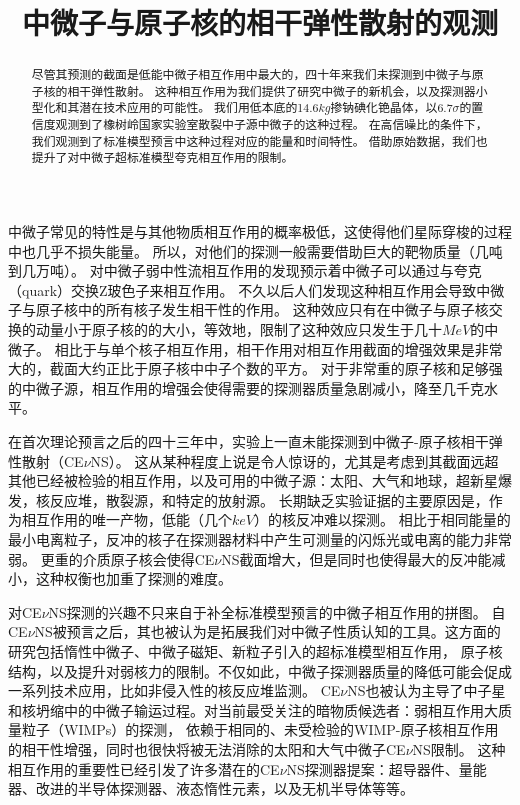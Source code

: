 
\begin{translation}
\label{cha:translation}

\title{中微子与原子核的相干弹性散射的观测}
\maketitle

\tableofcontents

\begin{abstract}
  尽管其预测的截面是低能中微子相互作用中最大的，四十年来我们未探测到中微子与原子核的相干弹性散射。
  这种相互作用为我们提供了研究中微子的新机会，以及探测器小型化和其潜在技术应用的可能性。
  我们用低本底的14.6$\si{kg}$掺钠碘化铯晶体，以6.7$\sigma$的置信度观测到了橡树岭国家实验室散裂中子源中微子的这种过程。
  在高信噪比的条件下，我们观测到了标准模型预言中这种过程对应的能量和时间特性。
  借助原始数据，我们也提升了对中微子超标准模型夸克相互作用的限制。
\end{abstract}

中微子常见的特性是与其他物质相互作用的概率极低，这使得他们星际穿梭的过程中也几乎不损失能量。
所以，对他们的探测一般需要借助巨大的靶物质量（几吨到几万吨）。
对中微子弱中性流相互作用的发现预示着中微子可以通过与夸克（quark）交换Z玻色子来相互作用。
不久以后人们发现这种相互作用会导致中微子与原子核中的所有核子发生相干性的作用。
这种效应只有在中微子与原子核交换的动量小于原子核的的大小，等效地，限制了这种效应只发生于几十$\si{MeV}$的中微子。
相比于与单个核子相互作用，相干作用对相互作用截面的增强效果是非常大的，截面大约正比于原子核中中子个数的平方。
对于非常重的原子核和足够强的中微子源，相互作用的增强会使得需要的探测器质量急剧减小，降至几千克水平。

在首次理论预言之后的四十三年中，实验上一直未能探测到中微子-原子核相干弹性散射（CE$\nu$NS）。
这从某种程度上说是令人惊讶的，尤其是考虑到其截面远超其他已经被检验的相互作用，以及可用的中微子源：太阳、大气和地球，超新星爆发，核反应堆，散裂源，和特定的放射源。
长期缺乏实验证据的主要原因是，作为相互作用的唯一产物，低能（几个$\si{keV}$）的核反冲难以探测。
相比于相同能量的最小电离粒子，反冲的核子在探测器材料中产生可测量的闪烁光或电离的能力非常弱。
更重的介质原子核会使得CE$\nu$NS截面增大，但是同时也使得最大的反冲能减小，这种权衡也加重了探测的难度。

对CE$\nu$NS探测的兴趣不只来自于补全标准模型预言的中微子相互作用的拼图。
自CE$\nu$NS被预言之后，其也被认为是拓展我们对中微子性质认知的工具。这方面的研究包括惰性中微子、中微子磁矩、新粒子引入的超标准模型相互作用，
原子核结构，以及提升对弱核力的限制。不仅如此，中微子探测器质量的降低可能会促成一系列技术应用，比如非侵入性的核反应堆监测。
CE$\nu$NS也被认为主导了中子星和核坍缩中的中微子输运过程。对当前最受关注的暗物质候选者：弱相互作用大质量粒子（WIMPs）的探测，
依赖于相同的、未受检验的WIMP-原子核相互作用的相干性增强，同时也很快将被无法消除的太阳和大气中微子CE$\nu$NS限制。
这种相互作用的重要性已经引发了许多潜在的CE$\nu$NS探测器提案：超导器件、量能器、改进的半导体探测器、液态惰性元素，以及无机半导体等等。


\end{translation}
